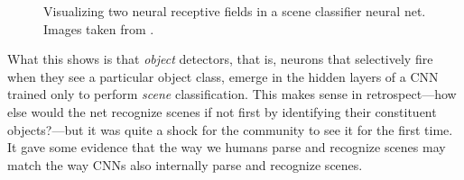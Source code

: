 \begin{figure}[h!]
{\begin{minipage}{.46\linewidth}
        \end{minipage}
    }
    \caption{Visualizing two neural receptive fields in a scene classifier neural net. Images taken from \cite{zhou2014object}.}
    \label{fig:representation_learning:obj_detectors_emerge}
\end{figure}

What this shows is that \textit{object} detectors, that is, neurons that selectively fire when they see a particular object class, emerge in the hidden layers of a CNN trained only to perform \textit{scene} classification. This makes sense in retrospect—how else would the net recognize scenes if not first by identifying their constituent objects?—but it was quite a shock for the community to see it for the first time. It gave some evidence that the way we humans parse and recognize scenes may match the way CNNs also internally parse and recognize scenes.

